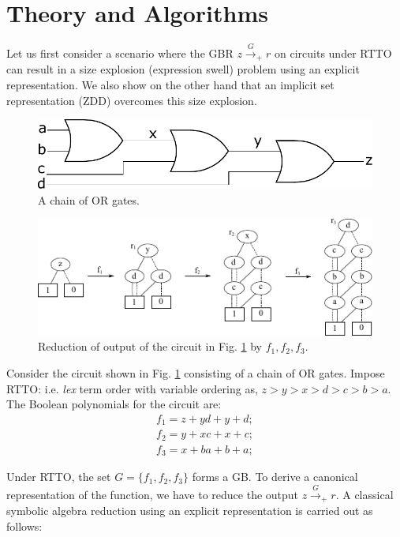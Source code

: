 \section{Theory and Algorithms}
\label{sec:theory}

Let us first consider a scenario where the GBR $z\xrightarrow{G}_+r$
on circuits under RTTO can result in a size explosion (expression
swell) problem using an explicit representation. We also show on the
other hand that an implicit set representation (ZDD) overcomes 
this size explosion. 

\begin{figure}[hbt]
\centering
\includegraphics[scale=0.40]{figures/Chain_Or_Gates.pdf}
\caption{A chain of OR gates.}
\label{ChainOrGate}
\end{figure}


\begin{figure}[hbt]
\centering
\includegraphics[scale=1.4]{figures/red_steps.pdf}
\caption{Reduction of output of the circuit in Fig. \ref{ChainOrGate} by $f_1,f_2,f_3$.}
\label{red_steps}
\end{figure}

Consider the circuit shown in Fig. \ref{ChainOrGate} consisting of a
chain of OR gates. Impose RTTO: i.e. {\it lex} term order with
variable ordering as, $z>y>x>d>c>b>a$. The Boolean polynomials for the
circuit are: 
\begin{align}
f_1 = z + y d + y +d;\\ 
f_2 = y + x c + x +c; \\
f_3 = x + b a + b +a;
\end{align}

Under RTTO, the set $G = \{f_1, f_2, f_3\}$ forms a GB. To derive a
canonical representation of the function, we have to reduce the
output $z\xrightarrow{G}_+r$. A classical symbolic algebra
reduction using an explicit representation is carried out as follows: 

